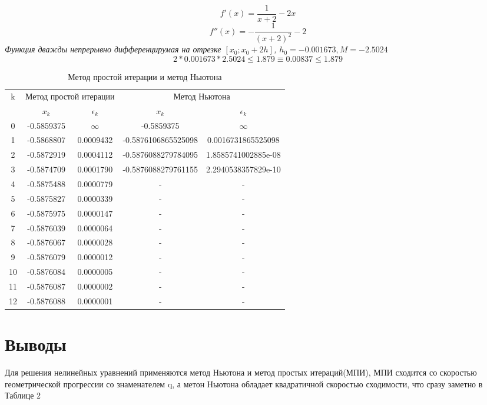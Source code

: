 \documentclass[12pt, a4paper]{article}
\begin{document}
 	\begin{equation} \label{eqn:df}
 		f'(x) = \frac{1}{x+2}-2x
 	\end{equation}
 \begin{equation} \label{eqn:df}
 f''(x) = -\frac{1}{(x+2)^2}-2
 \end{equation}
 	\textit{Функция дважды непрерывно дифференцирумая на отрезке $[x_0;x_0+2h]$, $h_0 = -0.001673, M = -2.5024$}
 	\begin{equation}
 		2*0.001673*2.5024 \le 1.879 \equiv 0.00837 \le 1.879
 	\end{equation}
	 \begin{table}[H]
	 	
	 	\centering
	 	\begin{tabular}{|c|c|c|c|c|}
	 		\hline
	 		\multirow{2}{*}{k} & \multicolumn{2}{c|}{Метод простой итерации} & \multicolumn{2}{c|}{Метод Ньютона} \\ \cline{2-5} 
	 		& $x_k$ &  $\epsilon_k$  & $x_k$ & $\epsilon_k$  \\ \hline
	 0 & -0.5859375 & $\infty$         & -0.5859375          & $\infty$                   \\
	1 & -0.5868807 &   0.0009432 & -0.5876106865525098 & 0.0016731865525098 \\
	2 & -0.5872919 &   0.0004112 & -0.5876088279784095 & 1.8585741002885e-08 \\
	3 & -0.5874709 &   0.0001790 & -0.5876088279761155 & 2.2940538357829e-10 \\
	4 & -0.5875488 &   0.0000779 & -                   & -                     \\
	5 & -0.5875827 &   0.0000339 & -                   & -                     \\
	6 & -0.5875975 &   0.0000147 & -                   & -                     \\
	7 & -0.5876039 &   0.0000064 & -                   & -                     \\
	8 & -0.5876067 &   0.0000028 & -                   & -                     \\
	9 & -0.5876079 &   0.0000012 & -                   & -                     \\
	10 & -0.5876084 &   0.0000005 & -                   & -                     \\
	11 & -0.5876087 &   0.0000002 & -                   & -                     \\
	12 & -0.5876088 &   0.0000001 & -                   & -                     \\ \hline

	 		
	 	\end{tabular}
 		\caption{Метод простой итерации и метод Ньютона}
 		\label{table:2}
	 \end{table}
	 
	 \section{Выводы}
	 
	 Для решения нелинейных уравнений применяются метод Ньютона и метод простых итераций(МПИ), МПИ сходится со скоростью геометрической прогрессии со знаменателем q, а метон Ньютона обладает квадратичной скоростью сходимости, что сразу заметно в Таблице 2
	 
\end{document}
